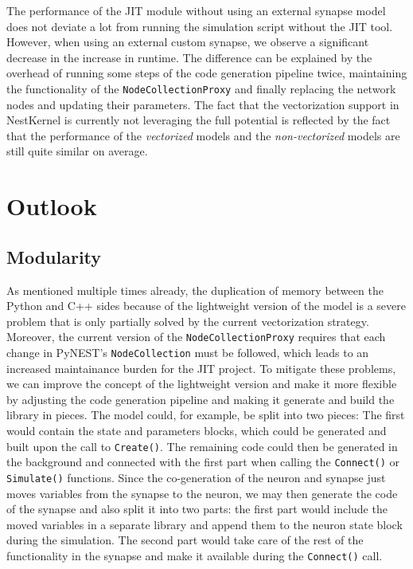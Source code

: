 The performance of the JIT module without using an external synapse model does not deviate a lot from running the simulation script without the JIT tool. However, when using an external custom synapse, we observe a significant decrease in the increase in runtime. The difference can be explained by the overhead of running some steps of the code generation pipeline twice, maintaining the functionality of the \texttt{NodeCollectionProxy} and finally replacing the network nodes and updating their parameters. The fact that the vectorization support in NestKernel is currently not leveraging the full potential is reflected by the fact that the performance of the \emph{vectorized} models and the \emph{non-vectorized} models are still quite similar on average.

\section{Outlook}

\subsection*{Modularity}

As mentioned multiple times already, the duplication of memory between the Python and C++ sides because of the lightweight version of the model is a severe problem that is only partially solved by the current vectorization strategy. Moreover, the current version of the \texttt{NodeCollectionProxy} requires that each change in PyNEST's \texttt{NodeCollection} must be followed, which leads to an increased maintainance burden for the JIT project. To mitigate these problems, we can improve the concept of the lightweight version and make it more flexible by adjusting the code generation pipeline and making it generate and build the library in pieces. The model could, for example, be split into two pieces: The first would contain the state and parameters blocks, which could be generated and built upon the call to \texttt{Create()}. The remaining code could then be generated in the background and connected with the first part when calling the \texttt{Connect()} or \texttt{Simulate()} functions. Since the co-generation of the neuron and synapse just moves variables from the synapse to the neuron, we may then generate the code of the synapse and also split it into two parts: the first part would include the moved variables in a separate library and append them to the neuron state block during the simulation. The second part would take care of the rest of the functionality in the synapse and make it available during the \texttt{Connect()} call.

